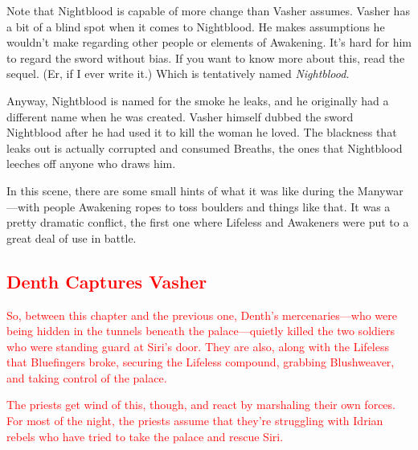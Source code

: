 Note that Nightblood is capable of more change than Vasher assumes. Vasher has a bit of a blind spot when it comes to Nightblood. He makes assumptions he wouldn’t make regarding other people or elements of Awakening. It’s hard for him to regard the sword without bias. If you want to know more about this, read the sequel. (Er, if I ever write it.) Which is tentatively named \textit{Nightblood}.

Anyway, Nightblood is named for the smoke he leaks, and he originally had a different name when he was created. Vasher himself dubbed the sword Nightblood after he had used it to kill the woman he loved. The blackness that leaks out is actually corrupted and consumed Breaths, the ones that Nightblood leeches off anyone who draws him.

In this scene, there are some small hints of what it was like during the Manywar—with people Awakening ropes to toss boulders and things like that. It was a pretty dramatic conflict, the first one where Lifeless and Awakeners were put to a great deal of use in battle.

\textcolor{red}{
\subsection*{Denth Captures Vasher}
}

\textcolor{red}{
So, between this chapter and the previous one, Denth’s mercenaries—who were being hidden in the tunnels beneath the palace—quietly killed the two soldiers who were standing guard at Siri’s door. They are also, along with the Lifeless that Bluefingers broke, securing the Lifeless compound, grabbing Blushweaver, and taking control of the palace.
}

\textcolor{red}{
The priests get wind of this, though, and react by marshaling their own forces. For most of the night, the priests assume that they’re struggling with Idrian rebels who have tried to take the palace and rescue Siri.
}


